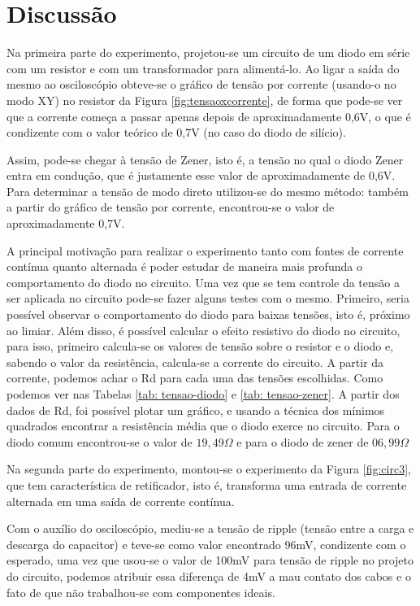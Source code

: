 \documentclass{article}
\begin{document}
\section{Discussão}
Na primeira parte do experimento, projetou-se um circuito de um diodo em série com um resistor e com um transformador para alimentá-lo. Ao ligar a saída do mesmo ao osciloscópio obteve-se o gráfico de tensão por corrente (usando-o no modo XY) no resistor da Figura \ref{fig:tensaoxcorrente}, de forma que pode-se ver que a corrente começa a passar apenas depois de aproximadamente 0,6V, o que é condizente com o valor teórico de 0,7V (no caso do diodo de silício).

Assim, pode-se chegar à tensão de Zener, isto é, a tensão no qual o diodo Zener entra em condução, que é justamente esse valor de aproximadamente de 0,6V. Para determinar a tensão de modo direto utilizou-se do mesmo método: também a partir do gráfico de tensão por corrente, encontrou-se o valor de aproximadamente 0,7V.

A principal motivação para realizar o experimento tanto com fontes de corrente contínua quanto alternada é poder estudar de maneira mais profunda o comportamento do diodo no circuito. Uma vez que se tem controle da tensão a ser aplicada no circuito pode-se fazer alguns testes com o mesmo. Primeiro, seria possível observar o comportamento do diodo para baixas tensões, isto é, próximo ao limiar. Além disso, é possível calcular o efeito resistivo do diodo no circuito, para isso, primeiro calcula-se os valores de tensão sobre o resistor e o diodo e, sabendo o valor da resistência, calcula-se a corrente do circuito. A partir da corrente, podemos achar o R{d} para cada uma das tensões escolhidas. Como podemos ver nas Tabelas \ref{tab: tensao-diodo} e \ref{tab: tensao-zener}. A partir dos dados de R{d}, foi possível plotar um gráfico, e usando a técnica dos mínimos quadrados encontrar a resistência média que o diodo exerce no circuito. Para o diodo comum encontrou-se o valor de $19,49\Omega$ e para o diodo de zener de $06,99\Omega$

Na segunda parte do experimento, montou-se o experimento da Figura \ref{fig:circ3}, que tem característica de retificador, isto é, transforma uma entrada de corrente alternada em uma saída de corrente contínua.

Com o auxílio do osciloscópio, mediu-se a tensão de ripple (tensão entre a carga e descarga do capacitor) e teve-se como valor encontrado 96mV, condizente com o esperado, uma vez que usou-se o valor de 100mV para tensão de ripple no projeto do circuito, podemos atribuir essa diferença de 4mV a mau contato dos cabos e o fato de que não trabalhou-se com componentes ideais.
\end{document}
